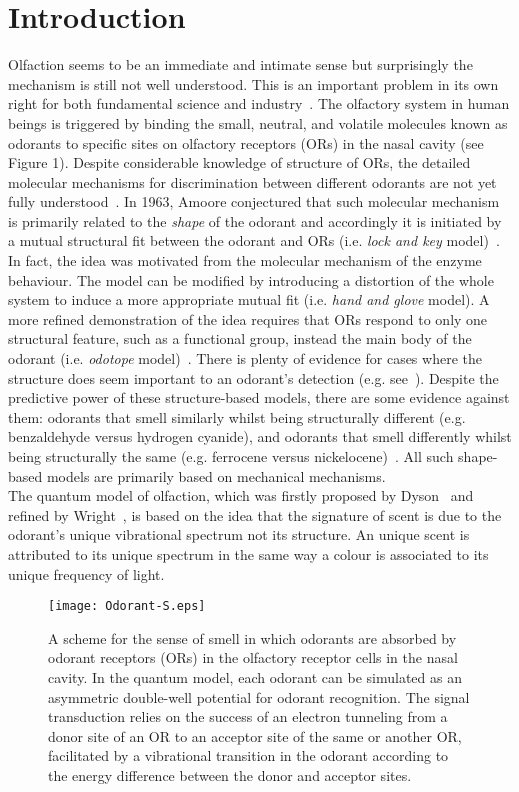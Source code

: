 \documentclass[aps,prl,tightenlines,onecolumn,superscriptaddress]{revtex4}
\begin{document}
\section{Introduction}
Olfaction seems to be an immediate and intimate sense but surprisingly the mechanism is still not well understood. This is an important problem in its own right for both fundamental science and industry~\cite{Row,Axe,Buc,LeeK,Fara}. The olfactory system in human beings is triggered by binding the small, neutral, and volatile molecules known as odorants to specific sites on olfactory receptors (ORs) in the nasal cavity (see Figure 1). Despite considerable knowledge of structure of ORs, the detailed molecular mechanisms for discrimination between different odorants are not yet fully understood~\cite{Zar}. In 1963, Amoore conjectured that such molecular mechanism is primarily related to the {\it shape} of the odorant and accordingly it is initiated by a mutual structural fit between the odorant and ORs (i.e. {\it lock and key} model)~\cite{Amo}. In fact, the idea was motivated from the molecular mechanism of the enzyme behaviour. The model can be modified by introducing a distortion of the whole system to induce a more appropriate mutual fit (i.e. {\it hand and glove} model). A more refined demonstration of the idea requires that ORs respond to only one structural feature, such as a functional group, instead the main body of the odorant (i.e. {\it odotope} model)~\cite{Mor}. There is plenty of evidence for cases where the structure does seem important to an odorant's detection (e.g. see~\cite{Yos,Ara}). Despite the predictive power of these structure-based models, there are some evidence against them: odorants that smell similarly whilst being structurally different (e.g. benzaldehyde versus hydrogen cyanide), and odorants that smell differently whilst being structurally the same (e.g. ferrocene versus nickelocene)~\cite{Tur,Ben,Bro0}. All such shape-based models are primarily based on mechanical mechanisms.\\
\indent The quantum model of olfaction, which was firstly proposed by Dyson~\cite{Dys} and refined by Wright~\cite{Wri}, is based on the idea that the signature of scent is due to the odorant's unique vibrational spectrum not its structure. An unique scent is attributed to its unique spectrum in the same way a colour is associated to its unique frequency of light.

\begin{figure}[H]
\texttt{[image: Odorant-S.eps]}\centering
\caption{A scheme for the sense of smell in which odorants are absorbed by odorant receptors (ORs) in the olfactory receptor cells in the nasal cavity. In the quantum model, each odorant can be simulated as an asymmetric double-well potential for odorant recognition. The signal transduction relies on the success of an electron tunneling from a donor site of an OR to an acceptor site of the same or another OR, facilitated by a vibrational transition in the odorant according to the energy difference between the donor and acceptor sites. }
\end{figure}
\end{document}
